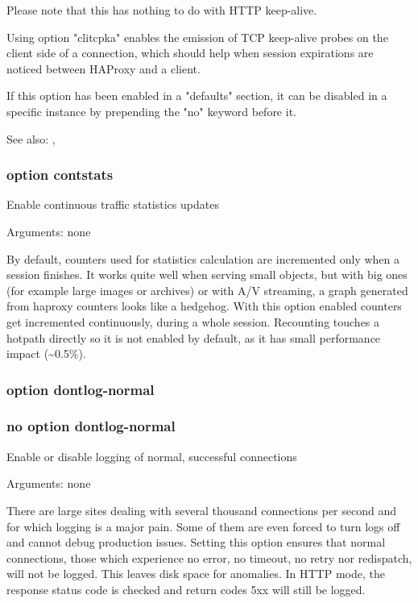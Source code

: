   Please note that this has nothing to do with HTTP keep-alive.

  Using option "clitcpka" enables the emission of TCP keep-alive probes on the
  client side of a connection, which should help when session expirations are
  noticed between HAProxy and a client.

  If this option has been enabled in a "defaults" section, it can be disabled
  in a specific instance by prepending the "no" keyword before it.

  See also: , 

\subsubsection[option contstats]{option contstats}


  Enable continuous traffic statistics updates


  Arguments: none

  By default, counters used for statistics calculation are incremented
  only when a session finishes. It works quite well when serving small
  objects, but with big ones (for example large images or archives) or
  with A/V streaming, a graph generated from haproxy counters looks like
  a hedgehog. With this option enabled counters get incremented continuously,
  during a whole session. Recounting touches a hotpath directly so
  it is not enabled by default, as it has small performance impact (\~{}0.5\%).

\subsubsection{option dontlog-normal}
\subsubsection{no option dontlog-normal}


  Enable or disable logging of normal, successful connections


  Arguments: none

  There are large sites dealing with several thousand connections per second
  and for which logging is a major pain. Some of them are even forced to turn
  logs off and cannot debug production issues. Setting this option ensures that
  normal connections, those which experience no error, no timeout, no retry nor
  redispatch, will not be logged. This leaves disk space for anomalies. In HTTP
  mode, the response status code is checked and return codes 5xx will still be
  logged.

